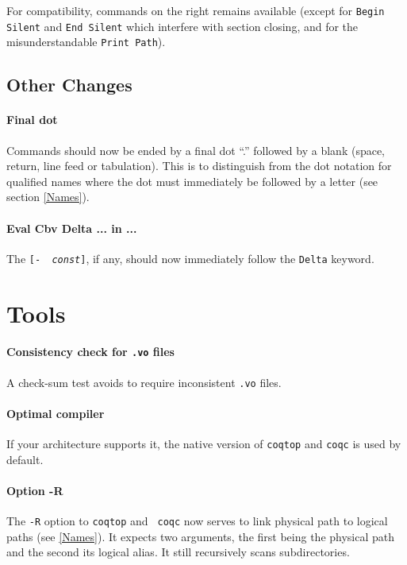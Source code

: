 \documentclass[11pt]{article}
\begin{document}
\medskip

For compatibility, commands on the right remains available (except for
{\tt Begin Silent} and {\tt End Silent} which interfere with
section closing, and for the misunderstandable {\tt Print Path}).

\subsection{Other Changes}


\paragraph{Final dot} Commands should now be ended by a final dot ``.'' followed by a blank
(space, return, line feed or tabulation). This is to distinguish from
the dot notation for qualified names where the dot must immediately be
followed by a letter (see section \ref{Names}).

\paragraph{Eval Cbv Delta ... in ...} The {\tt [- {\it
const}]}, if any, should now immediately follow the {\tt Delta} keyword.


\section{Tools}
\label{Tools}

\paragraph{Consistency check for {\tt .vo} files} A check-sum test
avoids to require inconsistent {\tt .vo} files.

\paragraph{Optimal compiler} If your architecture supports it, the native
version of {\tt coqtop} and {\tt coqc} is used by default.

\paragraph{Option -R} The {\tt -R} option to {\tt coqtop} and {\tt
coqc} now serves to link physical path to logical paths (see
\ref{Names}). It expects two arguments, the first being the physical
path and the second its logical alias. It still recursively scans
subdirectories.
\end{document}
